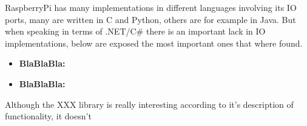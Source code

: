 RaspberryPi has many implementations in different languages involving its IO ports, many are written in C and Python, others are for example in Java. But when speaking in terms of .NET/C\# there is an important lack in IO implementations, below are exposed the most important ones that where found.

\begin{itemize}
\item \textbf{BlaBlaBla:}
\item \textbf{BlaBlaBla:}
\end{itemize}

Although the XXX library is really interesting according to it's description of functionality, it doesn't 